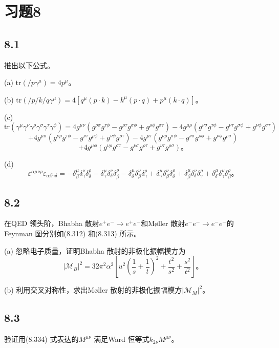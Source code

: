 \section{习题8}

\newpage
\subsection{8.1}
推出以下公式。

(a) $\text{tr}(\slash{p}\gamma^\mu) = 4p^\mu$。

(b) $\text{tr}(\slash{p}\slash{k}\slash{q}\gamma^\mu) = 4[q^\mu(p \cdot k) - k^\mu(p \cdot q) + p^\mu(k \cdot q)]$。

(c)
$$
\text{tr}(\gamma^\mu\gamma^\nu\gamma^\rho\gamma^\sigma\gamma^\tau\gamma^\phi) = 4g^{\mu\nu}(g^{\rho\sigma}g^{\tau\phi} - g^{\rho\tau}g^{\sigma\phi} + g^{\rho\phi}g^{\sigma\tau}) - 4g^{\mu\rho}(g^{\nu\sigma}g^{\tau\phi} - g^{\nu\tau}g^{\sigma\phi} + g^{\nu\phi}g^{\sigma\tau})
$$
$$
+ 4g^{\mu\sigma}(g^{\nu\rho}g^{\tau\phi} - g^{\nu\tau}g^{\rho\phi} + g^{\nu\phi}g^{\rho\tau}) - 4g^{\mu\tau}(g^{\nu\rho}g^{\sigma\phi} - g^{\nu\sigma}g^{\rho\phi} + g^{\nu\phi}g^{\rho\sigma})
$$
$$
+ 4g^{\mu\phi}(g^{\nu\rho}g^{\sigma\tau} - g^{\nu\sigma}g^{\rho\tau} + g^{\nu\tau}g^{\rho\sigma})。
$$

(d)
$$
\varepsilon^{\alpha\mu\nu\rho}\varepsilon_{\alpha\beta\gamma\delta} = -\delta^\mu_\beta\delta^\nu_\gamma\delta^\rho_\delta - \delta^\mu_\gamma\delta^\nu_\delta\delta^\rho_\beta - \delta^\mu_\delta\delta^\nu_\beta\delta^\rho_\gamma + \delta^\mu_\gamma\delta^\nu_\beta\delta^\rho_\delta + \delta^\mu_\beta\delta^\nu_\delta\delta^\rho_\gamma + \delta^\mu_\delta\delta^\nu_\gamma\delta^\rho_\beta。
$$

\newpage
\subsection{8.2}
在QED 领头阶，Bhabha 散射$e^+e^- \to e^+e^-$和Møller 散射$e^-e^- \to e^-e^-$的Feynman 图分别如(8.312) 和(8.313) 所示。

(a) 忽略电子质量，证明Bhabha 散射的非极化振幅模方为
$$
|\mathcal{M}_B|^2 = 32\pi^2\alpha^2 \left[ u^2 \left( \frac{1}{s} + \frac{1}{t} \right)^2 + \frac{t^2}{s^2} + \frac{s^2}{t^2} \right]。
$$

(b) 利用交叉对称性，求出Møller 散射的非极化振幅模方$|\mathcal{M}_M|^2$。

\newpage
\subsection{8.3}
验证用(8.334) 式表达的$M^{\mu\nu}$ 满足Ward 恒等式$k_{2\nu}M^{\mu\nu}$。

